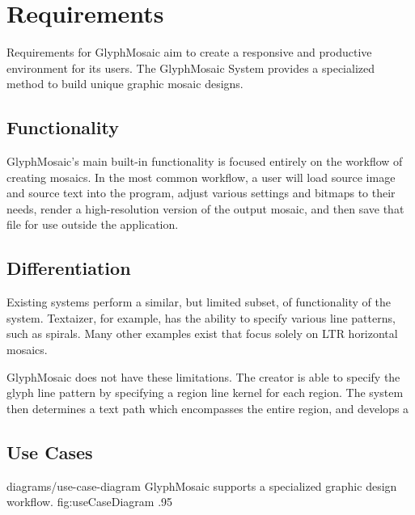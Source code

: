 \section{Requirements}
Requirements for GlyphMosaic aim to create a responsive and productive environment for its users.
The GlyphMosaic System provides a specialized method to build unique graphic mosaic designs.


\subsection{Functionality}
GlyphMosaic’s main built-in functionality is focused entirely on the workflow of creating mosaics.
In the most common workflow, a user will load source image and source text into the program, adjust various settings and bitmaps to their needs, render a high-resolution version of the output mosaic, and then save that file for use outside the application.

\subsection{Differentiation}
Existing systems perform a similar, but limited subset, of functionality of the system.
Textaizer\cite{textaizer}, for example, has the ability to specify various line patterns, such as spirals.
Many other examples exist that focus solely on LTR horizontal mosaics.

GlyphMosaic does not have these limitations.
The creator is able to specify the glyph line pattern by specifying a region line kernel for each region.
The system then determines a text path which encompasses the entire region, and develops a

\subsection{Use Cases}
\label{sec:usecases}

\begin{itemize}
\end{itemize}

\sidiagram
{diagrams/use-case-diagram}
{GlyphMosaic supports a specialized graphic design workflow.}
{fig:useCaseDiagram}
{.95}